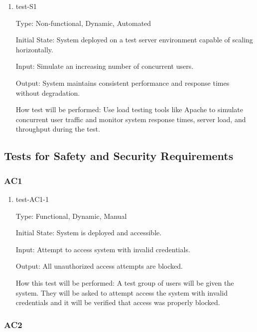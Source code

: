 \documentclass[12pt, titlepage]{article}
\begin{document}
\begin{enumerate}
    \item{test-S1} \label{test-S1}
    
    Type: Non-functional, Dynamic, Automated
    
    Initial State: System deployed on a test server environment capable of scaling horizontally.

    Input: Simulate an increasing number of concurrent users.

    Output: System maintains consistent performance and response times without degradation.
    
    How test will be performed: Use load testing tools like Apache to simulate concurrent user traffic and monitor system response times, server load, and throughput during the test.
    
\end{enumerate}


\subsection{Tests for Safety and Security Requirements} \label{section:4.3}

\subsubsection{AC1}

\begin{enumerate}

    \item{test-AC1-1} \label{test-AC1-1}
    
    Type: Functional, Dynamic, Manual
    
    Initial State: System is deployed and accessible.
    
    Input: Attempt to access system with invalid credentials.
    
    Output: All unauthorized access attempts are blocked.
    
    How this test will be performed: A test group of users will be given the system. They will be asked to attempt access the system with invalid credentials and it will be verified that access was properly blocked.
\end{enumerate}

\subsubsection{AC2}
\end{document}
